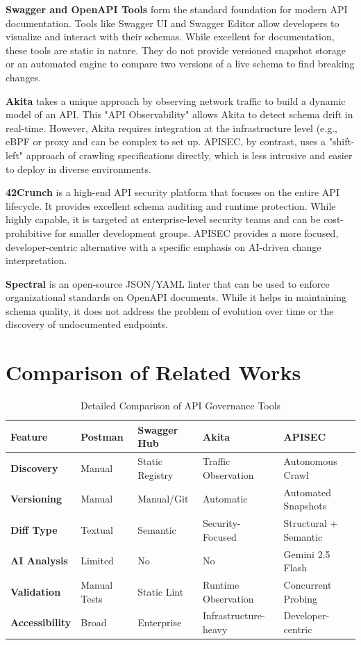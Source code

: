 \documentclass{fisatprojectfinal}
\begin{document}
\textbf{Swagger and OpenAPI Tools} \cite{swagger} form the standard foundation for modern API documentation. Tools like Swagger UI and Swagger Editor allow developers to visualize and interact with their schemas. While excellent for documentation, these tools are static in nature. They do not provide versioned snapshot storage or an automated engine to compare two versions of a live schema to find breaking changes.

\textbf{Akita} \cite{akita} takes a unique approach by observing network traffic to build a dynamic model of an API. This "API Observability" allows Akita to detect schema drift in real-time. However, Akita requires integration at the infrastructure level (e.g., eBPF or proxy and can be complex to set up. APISEC, by contrast, uses a "shift-left" approach of crawling specifications directly, which is less intrusive and easier to deploy in diverse environments.

\textbf{42Crunch} \cite{fortytwo} is a high-end API security platform that focuses on the entire API lifecycle. It provides excellent schema auditing and runtime protection. While highly capable, it is targeted at enterprise-level security teams and can be cost-prohibitive for smaller development groups. APISEC provides a more focused, developer-centric alternative with a specific emphasis on AI-driven change interpretation.

\textbf{Spectral} \cite{spectral} is an open-source JSON/YAML linter that can be used to enforce organizational standards on OpenAPI documents. While it helps in maintaining schema quality, it does not address the problem of evolution over time or the discovery of undocumented endpoints.

\section{Comparison of Related Works}

\begin{table}[H]
\centering
\caption{Detailed Comparison of API Governance Tools}
\label{tab:comparison_detailed}
\begin{tabularx}{\textwidth}{|l|X|X|X|X|}
\hline
\textbf{Feature} & \textbf{Postman} & \textbf{Swagger Hub} & \textbf{Akita} & \textbf{APISEC} \\
\hline
\textbf{Discovery} & Manual & Static Registry & Traffic Observation & Autonomous Crawl \\
\hline
\textbf{Versioning} & Manual & Manual/Git & Automatic & Automated Snapshots \\
\hline
\textbf{Diff Type} & Textual & Semantic & Security-Focused & Structural + Semantic \\
\hline
\textbf{AI Analysis} & Limited & No & No & Gemini 2.5 Flash \\
\hline
\textbf{Validation} & Manual Tests & Static Lint & Runtime Observation & Concurrent Probing \\
\hline
\textbf{Accessibility} & Broad & Enterprise & Infrastructure-heavy & Developer-centric \\
\hline
\end{tabularx}
\end{table}
\end{document}
